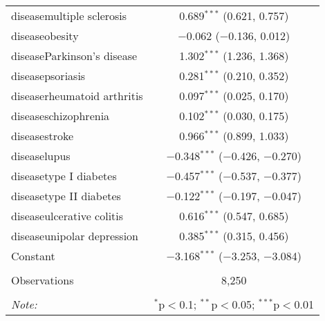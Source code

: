 \begin{table}[!htbp]
\begin{tabular}{@{\extracolsep{5pt}}lc}
  diseasemultiple sclerosis & 0.689$^{***}$ (0.621, 0.757) \\ 
  diseaseobesity & $-$0.062 ($-$0.136, 0.012) \\ 
  diseaseParkinson's disease & 1.302$^{***}$ (1.236, 1.368) \\ 
  diseasepsoriasis & 0.281$^{***}$ (0.210, 0.352) \\ 
  diseaserheumatoid arthritis & 0.097$^{***}$ (0.025, 0.170) \\ 
  diseaseschizophrenia & 0.102$^{***}$ (0.030, 0.175) \\ 
  diseasestroke & 0.966$^{***}$ (0.899, 1.033) \\ 
  diseaselupus & $-$0.348$^{***}$ ($-$0.426, $-$0.270) \\ 
  diseasetype I diabetes & $-$0.457$^{***}$ ($-$0.537, $-$0.377) \\ 
  diseasetype II diabetes & $-$0.122$^{***}$ ($-$0.197, $-$0.047) \\ 
  diseaseulcerative colitis & 0.616$^{***}$ (0.547, 0.685) \\ 
  diseaseunipolar depression & 0.385$^{***}$ (0.315, 0.456) \\ 
  Constant & $-$3.168$^{***}$ ($-$3.253, $-$3.084) \\ 
 \hline \\[-1.8ex] 
Observations & 8,250 \\ 
\hline 
\hline \\[-1.8ex] 
\textit{Note:}  & \multicolumn{1}{r}{$^{*}$p$<$0.1; $^{**}$p$<$0.05; $^{***}$p$<$0.01} \\ 
\end{tabular} 
\end{table} 
